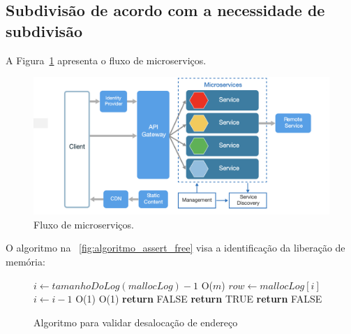 \subsection{Subdivisão de acordo com a necessidade de subdivisão}
\label{subsect:fig}


A Figura~\ref{fig_grafico} apresenta o fluxo de microserviços.

\begin{figure}[h!]
    \caption{\label{fig_grafico}Fluxo de microserviços.}
	\begin{center}
	    \includegraphics[scale=0.2]{images/arch.png}
	\end{center}
\end{figure}


O algoritmo na ~\autoref{fig:algoritmo_assert_free} visa a identificação da liberação de memória:

\begin{figure}[H]
	\caption{\label{fig:algoritmo_assert_free}Algoritmo para validar desalocação de endereço}
	\begin{center}
\begin{algorithmic}[1]
\State $i\gets tamanhoDoLog(mallocLog) - 1$
 \Comment O($m$)
\State $row\gets mallocLog[i]$
\State $i \gets i-1$
 \Comment O(1)
 \Comment O(1)
\State \textbf{return} FALSE
\Else
\State \textbf{return} TRUE
\EndIf
\EndIf
\EndWhile
\State \textbf{return} FALSE
\EndFunction
\end{algorithmic}
\end{center}
\end{figure}


